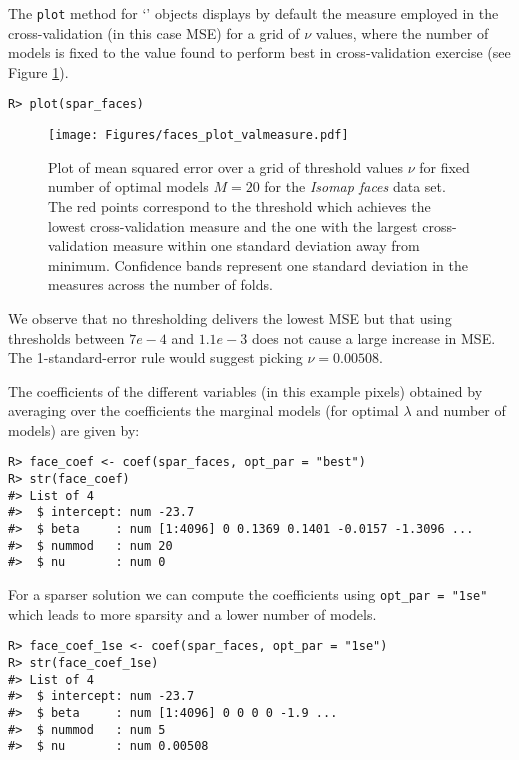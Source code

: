 \documentclass[
  article]{jss}
\newcommand{\class}[1]{`\code{#1}'}
\begin{document}
The \texttt{plot} method for \class{spar.cv} objects displays by default
the measure employed in the cross-validation (in this case MSE) for a
grid of \(\nu\) values, where the number of models is fixed to the value
found to perform best in cross-validation exercise (see Figure
\ref{fig:facesplot_valmeasure}).

\begin{verbatim}
R> plot(spar_faces)
\end{verbatim}

\begin{figure}[t!]
\centering
\texttt{[image: Figures/faces\_plot\_valmeasure.pdf]}
\caption{Plot of mean squared error over a grid of threshold values $\nu$ for fixed number of optimal models $M=20$ for the \emph{Isomap faces} data set.
The red points correspond to the threshold which achieves the lowest
cross-validation measure and the one with the largest cross-validation 
measure within one standard deviation away from minimum. Confidence bands represent one standard deviation in the measures across the number of folds. \label{fig:facesplot_valmeasure}}
\end{figure}

We observe that no thresholding delivers the lowest MSE but that using
thresholds between \(7e-4\) and \(1.1e-3\) does not cause a large
increase in MSE. The 1-standard-error rule would suggest picking
\(\nu=0.00508\).

The coefficients of the different variables (in this example pixels)
obtained by averaging over the coefficients the marginal models (for
optimal \(\lambda\) and number of models) are given by:

\begin{verbatim}
R> face_coef <- coef(spar_faces, opt_par = "best")
R> str(face_coef)
#> List of 4
#>  $ intercept: num -23.7
#>  $ beta     : num [1:4096] 0 0.1369 0.1401 -0.0157 -1.3096 ...
#>  $ nummod   : num 20
#>  $ nu       : num 0
\end{verbatim}

For a sparser solution we can compute the coefficients using
\texttt{opt\_par\ =\ "1se"} which leads to more sparsity and a lower
number of models.

\begin{verbatim}
R> face_coef_1se <- coef(spar_faces, opt_par = "1se")
R> str(face_coef_1se)
#> List of 4
#>  $ intercept: num -23.7
#>  $ beta     : num [1:4096] 0 0 0 0 -1.9 ...
#>  $ nummod   : num 5
#>  $ nu       : num 0.00508
\end{verbatim}
\end{document}
